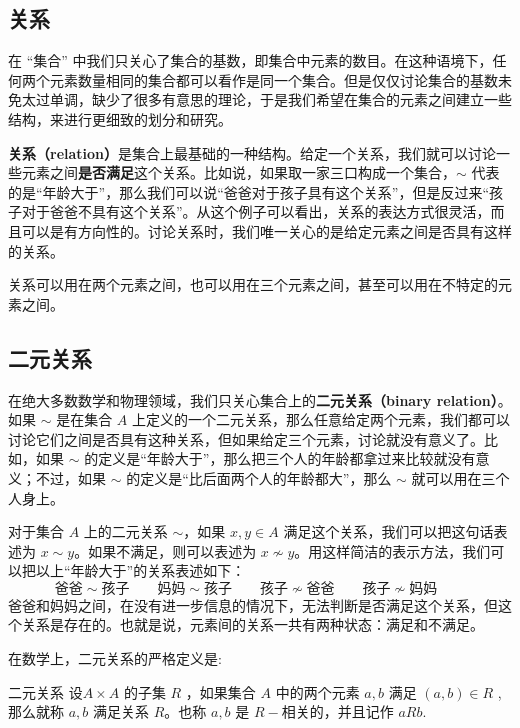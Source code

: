 

\subsection{关系}

在 “集合” 中我们只关心了集合的基数，即集合中元素的数目。在这种语境下，任何两个元素数量相同的集合都可以看作是同一个集合。但是仅仅讨论集合的基数未免太过单调，缺少了很多有意思的理论，于是我们希望在集合的元素之间建立一些结构，来进行更细致的划分和研究。

\textbf{关系（relation）}是集合上最基础的一种结构。给定一个关系，我们就可以讨论一些元素之间\textbf{是否满足}这个关系。比如说，如果取一家三口构成一个集合，$\sim$ 代表的是“年龄大于”，那么我们可以说“爸爸对于孩子具有这个关系”，但是反过来“孩子对于爸爸不具有这个关系”。从这个例子可以看出，关系的表达方式很灵活，而且可以是有方向性的。讨论关系时，我们唯一关心的是给定元素之间是否具有这样的关系。

关系可以用在两个元素之间，也可以用在三个元素之间，甚至可以用在不特定的元素之间。

\subsection{二元关系}\label{sub_Relat_3}

在绝大多数数学和物理领域，我们只关心集合上的\textbf{二元关系（binary relation）}。如果 $\sim$ 是在集合 $A$ 上定义的一个二元关系，那么任意给定两个元素，我们都可以讨论它们之间是否具有这种关系，但如果给定三个元素，讨论就没有意义了。比如，如果 $\sim$ 的定义是“年龄大于”，那么把三个人的年龄都拿过来比较就没有意义；不过，如果 $\sim$ 的定义是“比后面两个人的年龄都大”，那么 $\sim$ 就可以用在三个人身上。

对于集合 $A$ 上的二元关系 $\sim$，如果 $x, y\in A$ 满足这个关系，我们可以把这句话表述为 $x\sim y$。如果不满足，则可以表述为 $x\not\sim y$。用这样简洁的表示方法，我们可以把以上“年龄大于”的关系表述如下：
\begin{equation}
\text{爸爸}\sim\text{孩子} \qquad
\text{妈妈}\sim\text{孩子} \qquad
\text{孩子}\not\sim\text{爸爸} \qquad
\text{孩子}\not\sim\text{妈妈} \qquad
\end{equation}
爸爸和妈妈之间，在没有进一步信息的情况下，无法判断是否满足这个关系，但这个关系是存在的。也就是说，元素间的关系一共有两种状态：满足和不满足。

在数学上，二元关系的严格定义是:
\begin{definition}{二元关系}
设$A \times A$ 的子集 $R$ ，如果集合 $A$ 中的两个元素 $a,b$ 满足 $(a,b) \in R$ ,那么就称 $a,b$ 满足关系 $R$。也称 $a,b$ 是 $R-$相关的，并且记作 $aRb$.
\end{definition}

